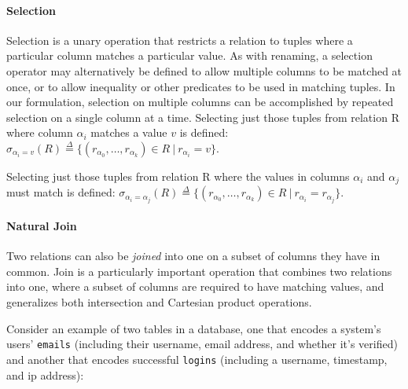 \paragraph{Selection} Selection is a unary operation that restricts a relation to tuples where a particular column matches a particular value. As with renaming, a selection operator may alternatively be defined to allow multiple columns to be matched at once, or to allow inequality or other predicates to be used in matching tuples. In our formulation, selection on multiple columns can be accomplished by repeated selection on a single column at a time. Selecting just those tuples from relation R where column $\alpha_i$ matches a value $v$ is defined: \newline$\sigma_{\alpha_i = v}(R) \overset{\Delta}{=} \{ (r_{\alpha_0}, \ldots, r_{\alpha_k}) \in R \ |\ r_{\alpha_i} = v \}$.

Selecting just those tuples from relation R where the values in columns $\alpha_i$ and $\alpha_j$ must match is defined: \newline$\sigma_{\alpha_i = \alpha_j}(R) \overset{\Delta}{=} \{ (r_{\alpha_0}, \ldots, r_{\alpha_k}) \in R \ |\ r_{\alpha_i} = r_{\alpha_j} \}$.

\paragraph{Natural Join} Two relations can also be \textit{joined} into one on a subset of columns they have in common. Join is a particularly important operation that combines two relations into one, where a subset of columns are required to have matching values, and generalizes both intersection and Cartesian product operations.

Consider an example of two tables in a database, one that encodes a system's users' \texttt{emails} (including their username, email address, and whether it's verified) and another that encodes successful \texttt{logins} (including a username, timestamp, and ip address):

